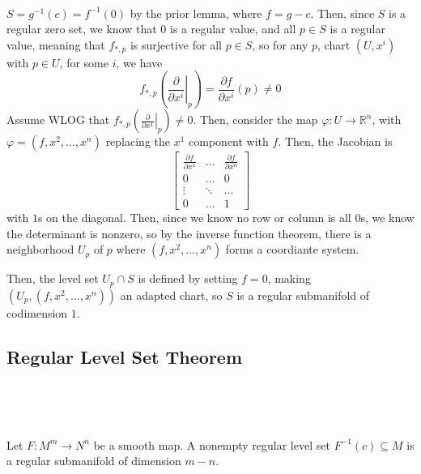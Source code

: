 \documentclass{article}
\begin{document}
\begin{customproof}
  \

  $S = g ^{-1}(c) = f ^{-1}(0)$ by the prior lemma, where $f = g -c$. Then, since $S$ is a regular zero set, we know that $0$ is a regular value, and all $p \in S$ is a regular value, meaning that $f_{*,p}$ is surjective for all $p \in S$, so for any $p$, chart $(U, x^i)$ with $p \in U$, for some $i$, we have $$f_{*, p}\left(\left.\frac{\partial}{\partial x^i}\right\vert_p \right) = \frac{\partial f}{\partial x^i}(p) \neq 0$$Assume WLOG that $f_{*,p}(\left.\frac{\partial}{\partial x^1}\right\vert_p) \neq 0$. Then, consider the map $\varphi: U \to \mathbb{R}^n$, with $\varphi = (f, x^2, \dots, x^n)$ replacing the $x^1$ component with $f$. Then, the Jacobian is $$
  \begin{bmatrix}
    \frac{\partial f}{\partial x^1} & \dots & \frac{\partial f}{\partial x^n}\\
    0 & \dots & 0 \\
    \vdots & \ddots & \dots \\
    0 & \dots & 1
  \end{bmatrix}$$with $1$s on the diagonal. Then, since we know no row or column is all $0$s, we know the determinant is nonzero, so by the inverse function theorem, there is a neighborhood $U_p$ of $p$ where $(f, x^2, \dots, x^n)$ forms a coordiante system.

  Then, the level set $U_p \cap S$ is defined by setting $f = 0$, making $(U_p, (f, x^2, \dots, x^n))$ an adapted chart, so $S$ is a regular submanifold of codimension $1$.
\end{customproof}

\subsection{Regular Level Set Theorem}
\

\begin{theorem}
  \

  Let $F: M^m \to N^n$ be a smooth map. A nonempty regular level set $F ^{-1}(c) \subseteq M$ is a regular submanifold of dimension $m - n$.
\end{theorem}
\end{document}
